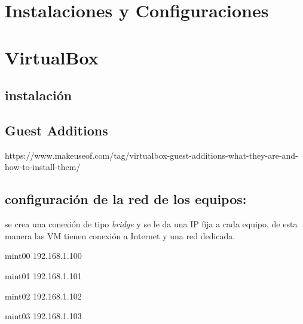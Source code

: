 \documentclass[../main.tex]{subfiles}
\begin{document}
\section*{Instalaciones y Configuraciones}
\section{VirtualBox}
\subsection{instalación}

\subsection{Guest Additions}
https://www.makeuseof.com/tag/virtualbox-guest-additions-what-they-are-and-how-to-install-them/

\subsection{configuración de la red de los equipos:}
se crea una conexión de tipo \textit{bridge }y se le da una IP fija a cada equipo, de esta manera las VM tienen conexión a Internet y una red dedicada.
\begin{list}{·}{}
	\item mint00 192.168.1.100
	\item mint01 192.168.1.101
	\item mint02 192.168.1.102
	\item mint03 192.168.1.103
\end{list}
\end{document}
